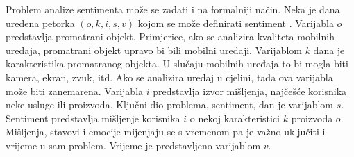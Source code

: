 \documentclass[times, utf8, zavrsni, numeric]{fer}
\begin{document}
\par Problem analize sentimenta može se zadati i na formalniji način.
Neka je dana uređena petorka $(o, k, i, s, v)$ kojom se može definirati sentiment 
\cite{Liu:2012:SAO:3019323}.
Varijabla $o$ predstavlja promatrani objekt. 
Primjerice, ako se analizira kvaliteta mobilnih uređaja, promatrani objekt upravo 
bi bili mobilni uređaji. Varijablom $k$ dana je karakteristika promatranog objekta. 
U slučaju mobilnih uređaja to bi mogla biti kamera, ekran, zvuk, itd.
Ako se analizira uređaj u cjelini, tada ova varijabla može biti zanemarena.
Varijabla $i$ predstavlja izvor mišljenja, najčešće korisnika neke usluge ili proizvoda.
Ključni dio problema, sentiment, dan je varijablom $s$. 
Sentiment predstavlja mišljenje korisnika $i$ o nekoj karakteristici $k$ proizvoda $o$.
Mišljenja, stavovi i emocije mijenjaju se s vremenom pa je važno uključiti i vrijeme u sam
problem. 
Vrijeme je predstavljeno varijablom $v$.
\end{document}
